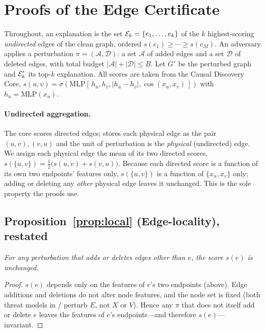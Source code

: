 
\section{Proofs of the Edge Certificate}
\label{app:proofs}

Throughout, an explanation is the set $\mathcal{E}_k=\{e_1,\dots,e_k\}$ of the $k$
highest-scoring \emph{undirected} edges of the clean graph, ordered
$s(e_1)\ge\cdots\ge s(e_M)$. An adversary applies a perturbation
$\pi=(\mathcal{A},\mathcal{D})$: a set $\mathcal{A}$ of added edges and a set
$\mathcal{D}$ of deleted edges, with total budget
$|\mathcal{A}|+|\mathcal{D}|\le B$. Let $G'$ be the perturbed graph and
$\mathcal{E}_k'$ its top-$k$ explanation. All scores are taken from the Causal Discovery
Core, $s(u,v)=\sigma(\mathrm{MLP}[\,h_u,h_v,|h_u-h_v|,\cos(x_u,x_v)\,])$ with
$h_u=\mathrm{MLP}(x_u)$.

\paragraph{Undirected aggregation.}
The core scores directed edges; \aeth{} stores each physical edge as the pair
$(u,v),(v,u)$ and the unit of perturbation is the \emph{physical} (undirected)
edge. We assign each physical edge the mean of its two directed scores,
$s(\{u,v\})=\tfrac12\big(s(u,v)+s(v,u)\big)$. Because each directed score is a
function of its own two endpoints' features only, $s(\{u,v\})$ is a function of
$\{x_u,x_v\}$ only; adding or deleting any \emph{other} physical edge leaves it
unchanged. This is the sole property the proofs use.

\subsection*{Proposition~\ref{prop:local} (Edge-locality), restated}
\emph{For any perturbation that adds or deletes edges other than $e$, the score
$s(e)$ is unchanged.}

\begin{proof}
$s(e)$ depends only on the features of $e$'s two endpoints (above). Edge
additions and deletions do not alter node features, and the node set is fixed
(both threat models in \xgn{}/\pgn{} perturb $E$, not $X$ or $V$). Hence any
$\pi$ that does not itself add or delete $e$ leaves the features of $e$'s
endpoints---and therefore $s(e)$---invariant.
\end{proof}

